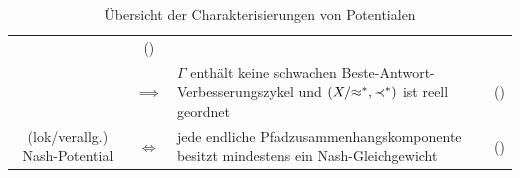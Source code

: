 \begin{table}
\begin{tabularx}{\textwidth}{ccXr}
		& (\Cref{satz:CharExBAPot})	\\
										& $\implies$	& $\Gamma$ enthält keine schwachen Beste-Antwort-Verbesserungszykel und $(X/{\approx^\ast}, \prec^\ast)$ ist reell geordnet
		& (\Cref{satz:CharExBAPot})		\\\hline
		(lok/verallg.) Nash-Potential	& $\iff$	& jede endliche Pfadzusammenhangskomponente besitzt mindestens ein Nash-Gleichgewicht
		& (\Cref{satz:CharExNashPot})
	\end{tabularx}	
	\caption{Übersicht der Charakterisierungen von Potentialen\\}\label{tab:PotCharakterisierung}
\end{table}

